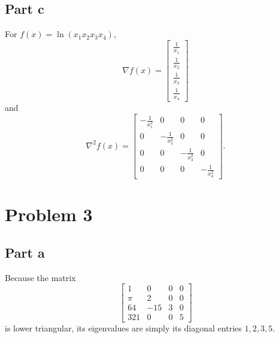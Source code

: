 \documentclass{article}
\begin{document}
\subsection{Part c}
For $f(x) = \ln(x_1x_2x_3x_4)$,
\[
\nabla f(x) = \begin{bmatrix} \frac{1}{x_1} \\ \frac{1}{x_2} \\\frac{1}{x_3} \\\frac{1}{x_4} \end{bmatrix}
\]
and 
\[
\nabla^2 f(x) = 
\begin{bmatrix} -\frac{1}{x_1^2}  & 0  &0  &0  \\
0  & -\frac{1}{x_2^2}  &0  &0 \\
0  & 0  &-\frac{1}{x_3^2}  &0  \\
0  & 0  &0  &-\frac{1}{x_4^2}
\end{bmatrix}.
\]

\section{Problem 3} 
\subsection{Part a}
Because the matrix \[
\begin{bmatrix}
1 & 0 & 0 & 0 \\
\pi & 2 & 0 & 0 \\
64 & -15 & 3 & 0 \\ 
321 & 0 & 0 & 5 
\end{bmatrix}
\]
is lower triangular, its eigenvalues are simply its diagonal entries $1, 2, 3, 5$.
\end{document}
